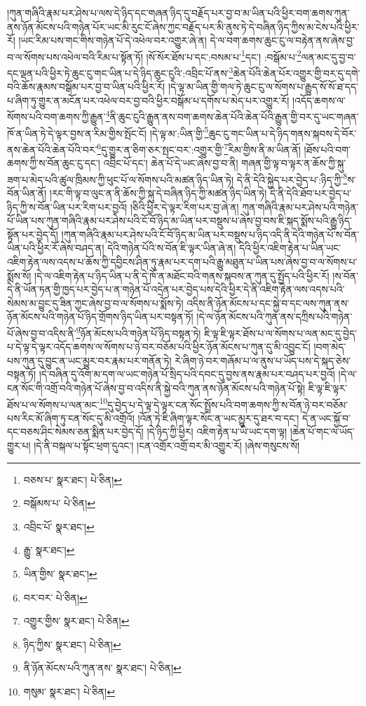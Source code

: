 །ཀུན་གཞིའི་རྣམ་པར་ཤེས་པ་ལས་དེ་ཉིད་དང་གཞན་ཉིད་དུ་བརྗོད་པར་བྱ་བ་མ་ཡིན་པའི་ཕྱིར་བག་ཆགས་ཀུན་ནས་ཉོན་མོངས་པའི་གཉེན་པོར་ཡང་མི་རུང་ངོ་ཞེས་ཀྱང་བརྗོད་པར་མི་ནུས་ཏེ་དེ་བཞིན་ཉིད་ཀྱིས་མ་ངེས་པའི་ཕྱིར་རོ། །ཡང་རིམ་པས་གང་གིས་གཉེན་པོ་དེ་འཕེལ་བར་འགྱུར་ཞེ་ན། དེ་ལ་བག་ཆགས་ཆུང་ངུ་ལ་བརྟེན་ནས་ཞེས་བྱ་བ་ལ་སོགས་པས་འཕེལ་བའི་རིམ་པ་སྟོན་ཏོ། །སོ་སོར་ཐོས་པ་དང་:བསམ་པ་\footnote{བཅས་པ་  སྣར་ཐང་།  པེ་ཅིན། }དང་། :བསྒོམ་པ་\footnote{བསྒོམས་པ་  པེ་ཅིན། }ལན་མང་དུ་བྱ་བ་དང་ལྡན་པའི་ཕྱིར་ཏེ་ཆུང་ངུ་གང་ཡིན་པ་དེ་ཉིད་ཆུང་ངུའི་:འབྲིང་པོ་ནས་\footnote{འབྲིང་པོ་  སྣར་ཐང་། }ཆེན་པོའི་ཆེན་པོར་འགྱུར་གྱི་བར་དུ་དགེ་བའི་ཆོས་རྣམས་བསྒོམ་པར་བྱ་བ་ཡིན་པའི་ཕྱིར་རོ། །དེ་ལྟ་མ་ཡིན་གྱི་གལ་ཏེ་ཆུང་ངུ་ལ་སོགས་པ་རྒྱུད་སོ་སོ་ཐ་དད་པ་ཞིག་ཏུ་གྱུར་ན་མངོན་པར་འཕེལ་བར་བྱ་བའི་ཕྱིར་བསྒོམ་པ་དགོས་པ་མེད་པར་འགྱུར་རོ། །འདོད་ཆགས་ལ་སོགས་པའི་བག་ཆགས་ཀྱི་རྒྱུན་\footnote{རྒྱུ་  སྣར་ཐང་། }ནི་ཆུང་ངུའི་རྒྱུན་ནས་བག་ཆགས་ཆེན་པོའི་ཆེན་པོའི་རྒྱུན་གྱི་བར་དུ་ཡང་གཞན་ཁོ་ན་ཡིན་ཏེ་དེ་ལྟར་བྱས་ན་རིམ་གྱིས་སྤོང་ངོ། །དེ་ལྟ་མ་:ཡིན་གྱི་\footnote{ཡིན་གྱིས་  སྣར་ཐང་། }ཆུང་ངུ་གང་ཡིན་པ་དེ་ཉིད་གནས་སྐབས་དེ་བོར་ནས་ཆེན་པོའི་ཆེན་པོའི་བར་\footnote{བར་བར་  པེ་ཅིན། }དུ་གྱུར་ན་ཅིག་ཅར་སྤང་བར་:འགྱུར་གྱི་\footnote{འགྱུར་གྱིས་  སྣར་ཐང་།  པེ་ཅིན། }རིམ་གྱིས་ནི་མ་ཡིན་ནོ། །ཐོས་པའི་བག་ཆགས་ཀྱི་ས་བོན་ཆུང་ངུ་དང་། འབྲིང་པོ་དང་། ཆེན་པོ་དེ་ཡང་ཞེས་བྱ་བ་ནི། གཞན་གྱི་ལྟ་བ་ལྟར་ན་ཆོས་ཀྱི་སྐུ་ཟག་པ་མེད་པའི་ཚུལ་ཁྲིམས་ཀྱི་ཕུང་པོ་ལ་སོགས་པའི་མཚན་ཉིད་ཡིན་ཏེ། དེ་ནི་དེའི་སྐྱེད་པར་བྱེད་པ་:ཉིད་ཀྱི་\footnote{ཉིད་ཀྱིས་  སྣར་ཐང་།  པེ་ཅིན། }ས་བོན་ཡིན་ནོ། །རང་གི་ལྟ་བ་ལུང་ན་ནི་ཆོས་ཀྱི་སྐུ་དེ་བཞིན་ཉིད་ཀྱི་མཚན་ཉིད་ཡིན་ཏེ། དེ་ནི་དེའི་ཐོབ་པར་བྱེད་པ་ཉིད་ཀྱི་ས་བོན་ཡིན་པར་རིག་པར་བྱའོ། །ཅིའི་ཕྱིར་དེ་ལྟར་རིག་པར་བྱ་ཞེ་ན། ཀུན་གཞིའི་རྣམ་པར་ཤེས་པའི་གཉེན་པོ་ཡིན་པས་ཀུན་གཞིའི་རྣམ་པར་ཤེས་པའི་ངོ་བོ་ཉིད་མ་ཡིན་པར་བསྡུས་པ་ཞེས་བྱ་བས་ཇི་སྐད་སྨོས་པའི་རྒྱུ་ཉིད་སྟོན་པར་བྱེད་དོ། །ཀུན་གཞིའི་རྣམ་པར་ཤེས་པའི་ངོ་བོ་ཉིད་མ་ཡིན་པར་བསྡུས་པ་ཉིད་འདི་ནི་དེའི་གཉེན་པོ་ས་བོན་ཡིན་པའི་ཕྱིར་རོ་ཞེས་བཤད་ན། དེའི་གཉེན་པོའི་ས་བོན་ཇི་ལྟར་ཡིན་ཞེ་ན། དེའི་ཕྱིར་འཇིག་རྟེན་པ་ཡིན་ཡང་འཇིག་རྟེན་ལས་འདས་པ་ཆོས་ཀྱི་དབྱིངས་ཤིན་ཏུ་རྣམ་པར་དག་པའི་རྒྱུ་མཐུན་པ་ཡིན་པས་ཞེས་བྱ་བ་ལ་སོགས་པ་སྨོས་སོ། །དེ་ལ་འཇིག་རྟེན་པ་ཉིད་ཡིན་པ་ནི་དེ་ཁོ་ན་མཐོང་བའི་གནས་སྐབས་ན་ཀུན་དུ་སྤྱོད་པའི་ཕྱིར་རོ། །ས་བོན་དེ་ནི་ཡོན་ཏན་གྱི་ཁྱད་པར་བྱེད་པ་ན་གཉེན་པོ་འདྲེན་པར་བྱེད་པས་དེའི་ཕྱིར་དེ་ནི་འཇིག་རྟེན་ལས་འདས་པའི་སེམས་མ་བྱུང་དུ་ཟིན་ཀྱང་ཞེས་བྱ་བ་ལ་སོགས་པ་སྨོས་ཏེ། འདིས་ནི་ཉོན་མོངས་པ་དང་སྐྱེ་བ་དང་ལས་ཀུན་ནས་ཉོན་མོངས་པའི་གཉེན་པོ་ཉིད་གྲོགས་ཉིད་ཡིན་པར་བསྟན་ཏོ། །དེ་ལ་ཉོན་མོངས་པའི་ཀུན་ནས་དཀྲིས་པའི་གཉེན་པོ་ཞེས་བྱ་བ་འདིས་ནི་\footnote{ནི་ཉོན་མོངས་པའི་ཀུན་ནས་  སྣར་ཐང་།  པེ་ཅིན། }ཉོན་མོངས་པའི་གཉེན་པོ་ཉིད་བསྟན་ཏེ། ཇི་ལྟ་ཇི་ལྟར་ཐོས་པ་ལ་སོགས་པ་ལན་མང་དུ་བྱེད་པ་དེ་ལྟ་དེ་ལྟར་འདོད་ཆགས་ལ་སོགས་པ་ཉེ་བར་བཅོམ་པའི་ཕྱིར་ཉོན་མོངས་པ་ཀུན་དུ་མི་འབྱུང་ངོ། །བག་མེད་པས་ཀུན་དུ་བྱུང་ན་ཡང་མྱུར་བར་རྣམ་པར་གནོན་ཏེ། རེ་ཞིག་ཉེ་བར་གཞོམ་པ་ལ་ནུས་པ་ཡོད་པས་དེ་སྐད་ཅེས་བསྟན་ཏོ། །དེ་བཞིན་དུ་འོག་མ་དག་ལ་ཡང་གཉེན་པོ་སྲིད་པའི་དབང་དུ་བྱས་ནས་རྣམ་པར་བཤད་པར་བྱའོ། །དེ་ལ་ངན་སོང་གི་འགྲོ་བའི་གཉེན་པོ་ཞེས་བྱ་བ་འདིས་ནི་སྐྱེ་བའི་ཀུན་ནས་ཉོན་མོངས་པའི་གཉེན་པོ་སྟེ། ཇི་ལྟ་ཇི་ལྟར་ཐོས་པ་ལ་སོགས་པ་ལན་མང་\footnote{གསུམ་  སྣར་ཐང་།  པེ་ཅིན། }དུ་བྱེད་པ་དེ་ལྟ་དེ་ལྟར་ངན་སོང་སྤྲོས་པའི་བག་ཆགས་ཀྱི་ས་བོན་ཉེ་བར་བཅོམ་པས་རིང་མོ་ཞིག་ཏུ་ངན་སོང་དུ་མི་འགྲོའོ། །འོན་ཏེ་ཇི་ཞིག་ལྟར་སོང་ན་ཡང་མྱུར་དུ་ཐར་བ་དང་། དེ་ན་ཡང་སྐྱོ་བ་དང་བཅས་ཤིང་སེམས་ཅན་སྨིན་པར་བྱེད་དོ། །དེ་ཉིད་ཀྱི་ཕྱིར། འཇིག་རྟེན་པ་ཡི་ཡང་དག་ལྟ། །ཆེན་པོ་གང་ལ་ཡོད་གྱུར་པ། །དེ་ནི་བསྐལ་པ་སྟོང་ཕྲག་དུའང་། །ངན་འགྲོར་འགྲོ་བར་མི་འགྱུར་རོ། །ཞེས་གསུངས་སོ། 